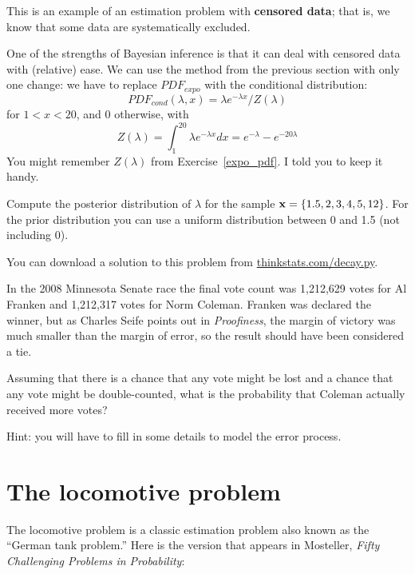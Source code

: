 \documentclass[12pt]{book}
\begin{document}
This is an example of an estimation problem with {\bf censored data};
that is, we know that some data are systematically excluded.

One of the strengths of Bayesian inference is that it can deal with
censored data with (relative) ease.  We can use the method from the
previous section with only one change: we have to replace
$PDF_{expo}$ with the conditional distribution:
%
\[ PDF_{cond}(\lambda, x) = \lambda e^{-\lambda x} / Z(\lambda)  \]
%
for $1 < x < 20$, and 0 otherwise, with
%
\[ Z(\lambda) = \int_1^{20} \lambda e^{-\lambda x} dx = 
e^{-\lambda} - e^{-20 \lambda}  \]
%
You might remember $Z(\lambda)$ from Exercise~\ref{expo_pdf}.  I told
you to keep it handy.

\begin{ex}

Compute the posterior distribution of $\lambda$ for the sample
$\mathbf{x} = \{ 1.5, 2, 3, 4, 5, 12 \}$.  For the prior distribution you
can use a uniform distribution between 0 and 1.5 (not including 0).

You can download a solution to this problem from
\url{thinkstats.com/decay.py}.

\end{ex}


\begin{ex}

In the 2008 Minnesota Senate race the final vote count was 1,212,629
votes for Al Franken and 1,212,317 votes for Norm Coleman.  Franken
was declared the winner, but as Charles Seife points out in {\it
  Proofiness}, the margin of victory was much smaller than the margin
of error, so the result should have been considered a tie.

Assuming that there is a chance that any vote might be lost and a chance
that any vote might be double-counted, what is the probability that
Coleman actually received more votes?

Hint: you will have to fill in some details to model the error process.

\end{ex}


\section{The locomotive problem}

The locomotive problem is a classic estimation problem also
known as the ``German tank problem.''  Here is the version
that appears in Mosteller, {\it Fifty Challenging Problems in
  Probability}:
\end{document}

